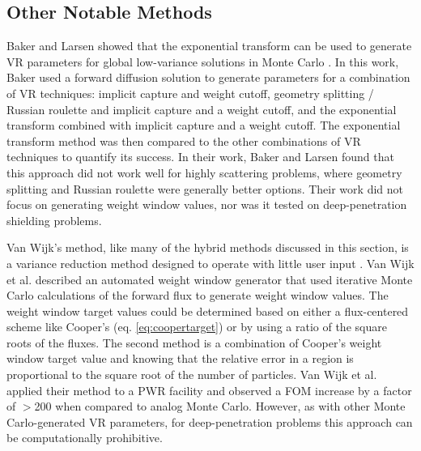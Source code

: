 \subsection{Other Notable Methods}
Baker and Larsen showed that the exponential transform can be used to generate
VR parameters for global low-variance solutions in Monte Carlo
\cite{baker_localexponential_1993}. In this work, Baker used a forward diffusion
solution to generate parameters for a combination of VR techniques: implicit
capture and weight cutoff, geometry splitting / Russian roulette and implicit
capture and a weight cutoff, and the exponential transform combined with
implicit capture and a weight cutoff. The exponential transform method was then
compared to the other combinations of VR techniques to quantify its success.
In their work, Baker and Larsen found that
this approach did not work well for highly scattering problems, where geometry
splitting and Russian roulette were generally better options. Their work did not
focus on generating weight window values, nor was it tested on deep-penetration
shielding problems.

Van Wijk's method, like many of the hybrid methods discussed in this section,
is a variance reduction method
designed to operate with little user input \cite{van_wijk_easy_2011}. Van Wijk
et al. described an automated weight window generator that used iterative Monte
Carlo calculations of the forward flux to generate weight window values. The
weight window target values could be determined based on either a flux-centered
scheme like Cooper's (eq. \eqref{eq:coopertarget})
or by using a ratio of the square roots of the fluxes. The
second method is a combination of Cooper's weight window target value and
knowing that the relative error in a region
is proportional to the square root of the number
of particles.
Van Wijk et al. applied their method to a PWR facility and observed a FOM
increase by a factor of $>$200 when compared to analog Monte Carlo. However, as
with other Monte Carlo-generated VR parameters, for deep-penetration problems
this approach can be computationally prohibitive.

